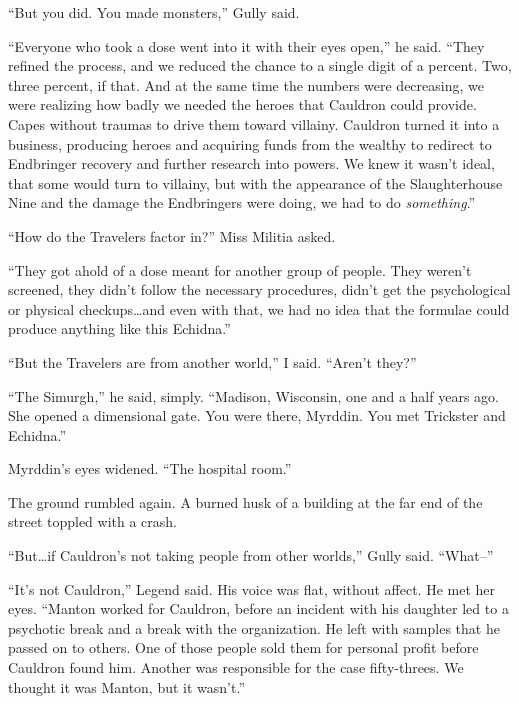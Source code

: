``But you did.  You made monsters,'' Gully said.



``Everyone who took a dose went into it with their eyes open,'' he said.  ``They refined the process, and we reduced the chance to a single digit of a percent.  Two, three percent, if that.  And at the same time the numbers were decreasing, we were realizing how badly we needed the heroes that Cauldron could provide.  Capes without traumas to drive them toward villainy.  Cauldron turned it into a business, producing heroes and acquiring funds from the wealthy to redirect to Endbringer recovery and further research into powers.  We knew it wasn't ideal, that some would turn to villainy, but with the appearance of the Slaughterhouse Nine and the damage the Endbringers were doing, we had to do \emph{something}.''



``How do the Travelers factor in?'' Miss Militia asked.



``They got ahold of a dose meant for another group of people.  They weren't screened, they didn't follow the necessary procedures, didn't get the psychological or physical checkups\ldots and even with that, we had no idea that the formulae could produce anything like this Echidna.''



``But the Travelers are from another world,'' I said.  ``Aren't they?''



``The Simurgh,'' he said, simply.  ``Madison, Wisconsin, one and a half years ago.  She opened a dimensional gate.  You were there, Myrddin.  You met Trickster and Echidna.''



Myrddin's eyes widened.  ``The hospital room.''



The ground rumbled again.  A burned husk of a building at the far end of the street toppled with a crash.



``But\ldots if Cauldron's not taking people from other worlds,'' Gully said.  ``What--''



``It's not Cauldron,'' Legend said.  His voice was flat, without affect.  He met her eyes.  ``Manton worked for Cauldron, before an incident with his daughter led to a psychotic break and a break with the organization.  He left with samples that he passed on to others.  One of those people sold them for personal profit before Cauldron found him.  Another was responsible for the case fifty-threes.  We thought it was Manton, but it wasn't.''



